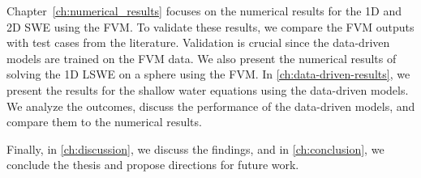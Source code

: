 Chapter~\ref{ch:numerical_results} focuses on the numerical results for the 1D and 2D SWE using the FVM.
To validate these results, we compare the FVM outputs with test cases from the literature. Validation is crucial since the data-driven models are trained on the FVM data.
We also present the numerical results of solving the 1D LSWE on a sphere using the FVM.
In \autoref{ch:data-driven-results}, we present the results for the shallow water equations using the data-driven models.
We analyze the outcomes, discuss the performance of the data-driven models, and compare them to the numerical results.

Finally, in \autoref{ch:discussion}, we discuss the findings, and in \autoref{ch:conclusion}, we conclude the thesis and propose directions for future work.



